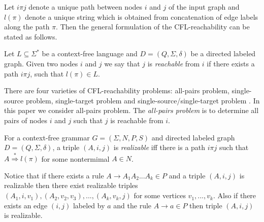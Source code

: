 Let $i\pi j$ denote a unique path between nodes $i$ and $j$ of the input graph and $l(\pi)$ denote a unique string which is obtained from concatenation of edge labels along the path $\pi$. Then the general formulation of the CFL-reachability can be stated as follows.
\begin{definition}
Let $L \subseteq \Sigma^*$ be a context-free language and $D = (Q, \Sigma, \delta)$ be a directed labeled graph. Given two nodes $i$ and $j$ we say that $j$ is \textit{reachable} from $i$ if there exists a path $i \pi j$, such that $l(\pi) \in L$. 
\end{definition}
There are four varieties of CFL-reachability problems: all-pairs problem, single-source problem, single-target problem and single-source/single-target problem \cite{RepsBasic}. In this paper we consider all-pairs problem. The \textit{all-pairs problem} is to determine all pairs of nodes $i$ and $j$ such that $j$ is reachable from $i$. 

\begin{definition}
\label{def:triple}
For a context-free grammar $G = (\Sigma, N, P, S)$ and directed labeled graph $D = (Q, \Sigma, \delta)$, a triple $(A, i, j)$ is \textit{realizable} iff there is a path $i\pi j$ such that $A \stackrel {*}{\Rightarrow } l(\pi)$ for some nontermimal $A \in N$.
\end{definition}
Notice that if there exists a rule $A \rightarrow A_1A_2...A_k \in P$ and a triple $(A, i,  j)$ is realizable then there exist realizable triples $(A_1, i, v_1), (A_2, v_2, v_3), ..., (A_k, v_k, j)$ for some vertices $v_1, ..., v_k$. Also if there exists an edge $(i, j)$ labeled by $a$ and the rule $A \rightarrow a \in P$ then triple $(A, i, j)$ is realizable.

